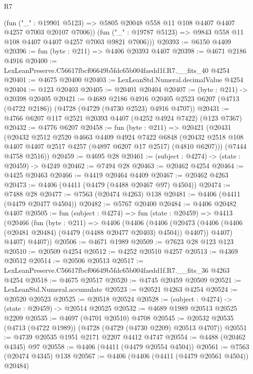 \begin{lexlean}{R7}
\begin{coremodule}
          (fun ("_" : @19901 @5123) =>
          @5805 @20048 @558 @11 @108 @4407 @4407 @4257 @7003 @20107 @7006))
        (fun ("_" : @19787 @5123) => @9843 @558 @11 @108 @4407 @4407 @4257 @7003 @9821 @7006)))
@20393 := @6150 @4409
@20396 := fun (byte : @211) => @4406 @20393 @4407
@20398 := @4671 @2186 @4916
@20400 := LexLeanPreserve.C56617fbcf06649b5fdc65b004faedd1f.R7.__fits_40 @4254
@20401 := @4675 @20400
@20403 := LexLeanStd.Numeral.decimalValue @4254
@20404 := @123 @20403
@20405 := @20401 @20404
@20407 := (byte : @211) -> @20398 @20405
@20421 := @4689
    @2186
    @4916
    @20405
    @2523
    @6207
    (@4713 (@4722 @2186))
    (@4728 (@4729 (@4730 @2523) @4916 @4707))
@20431 := @4766 @6207 @117 @2521 @20393 @4407 (@4252 @4924 @7422) (@123 @7367)
@20432 := @4776 @6207
@20458 := fun (byte : @211) =>
  @20421
    (@20431
      (@20432
        @2512
        @2520
        @4663
        @4409
        @4924
        @7422
        @6848
        (@20432 @2518 @108 @4407 @4407 @2517 @4257 (@4897 @6207 @17 @2517) (@4810 @6207)))
      (@7444 @4758 @2516))
@20459 := @4695 @28
@20461 := (subject : @4274) -> (state : @20459) -> @4249
@20462 := @7494 @28
@20463 := @20462 @4254
@20464 := @4425 @20463
@20466 := @4419 @20464 @4409
@20467 := @20462 @4263
@20473 := @4406 (@4411 (@4479 (@4488 @20467 @97) @4504))
@20474 := @7488 @28
@20477 := @7563 (@20474 @4263) @138
@20481 := @4406 (@4411 (@4479 @20477 @4504))
@20482 := @5767 @20400
@20484 := @4406 @20482 @4407
@20505 := fun (subject : @4274) =>
  fun (state : @20459) =>
  @4413
    (@20466
      (fun (byte : @211) =>
      @4406
        (@4406
          (@4406
            (@20473 (@4406 (@4406 (@20481 @20484) (@4479 (@4488 @20477 @20403) @4504)) @4407))
            @4407)
          @4407)
        @4407))
@20506 := @4671 @1989
@20509 := @7623 @28 @123 @123
@20510 := @20509 @4254
@20512 := @4252 @20510 @4257
@20513 := @4369 @20512
@20514 := @20506 @20513
@20517 := LexLeanPreserve.C56617fbcf06649b5fdc65b004faedd1f.R7.__fits_36 @4263 @4254
@20518 := @4675 @20517
@20520 := @4745 @20459 @20509
@20521 := LexLeanStd.Numeral.accumulate
@20523 := @20521 @4263 @4254
@20524 := @20520 @20523
@20525 := @20518 @20524
@20528 := (subject : @4274) -> (state : @20459) -> @20514 @20525
@20532 := @4689 @1989 @20513 @20525 @2209
@20535 := @4697 (@4701 @20510) @4708
@20545 := @20532 @20535 (@4713 (@4722 @1989)) (@4728 (@4729 (@4730 @2209) @20513 @4707))
@20551 := @4739 @20535 @1951 @2171 @2207 @4412 @4747
@20554 := @4488 (@20462 @4345) @97
@20558 := @4406 (@4411 (@4479 @20554 @4504))
@20561 := @7563 (@20474 @4345) @138
@20567 := @4406 (@4406 (@4411 (@4479 @20561 @4504)) @20484)

\end{coremodule}
\end{lexlean}
